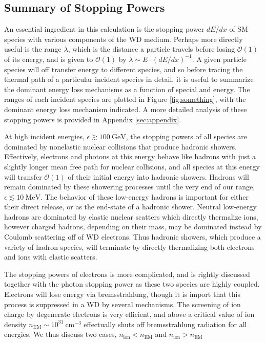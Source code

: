 \documentclass[twocolumn,showpacs,preprintnumbers,amsmath,amssymb,prd]{revtex4}
\newcommand{\OO}{\mathcal{O}}
\newcommand{\GeV}{\text{GeV}}
\newcommand{\MeV}{\text{MeV}}
\def\r{\right)}
\def\l{\left(}
\begin{document}
\subsection{Summary of Stopping Powers}

An essential ingredient in this calculation is the stopping power $dE/dx$ of SM species with various components of the WD medium. 
Perhaps more directly useful is the range $\lambda$, which is the distance a particle travels before losing $\OO(1)$ of its energy, and is given to $\OO(1)$ by $\lambda \sim E \cdot \l dE/dx \r^{-1}$.
A given particle species will off transfer energy to different species, and so before tracing the thermal path of a particular incident species in detail, it is useful to summarize the dominant energy loss mechanisms as a function of special and energy. 
The ranges of each incident species are plotted in Figure \ref{fig:something}, with the dominant energy loss mechanism indicated.
A more detailed analysis of these stopping powers is provided in Appendix \ref{sec:appendix}. 

At high incident energies, $\epsilon \gtrsim 100~\GeV$, the stopping powers of all species are dominated by nonelastic nuclear collisions that produce hadronic showers. 
Effectively, electrons and photons at this energy behave like hadrons with just a slightly longer mean free path for nuclear collisions, and all species at this energy will transfer $\OO(1)$ of their initial energy into hadronic showers.
Hadrons will remain dominated by these showering processes until the very end of our range, $\epsilon \lesssim 10~\MeV$. 
The behavior of these low-energy hadrons is important for either their direct release, or as the end-state of a hadronic shower. 
Neutral low-energy hadrons are dominated by elastic nuclear scatters which directly thermalize ions, however charged hadrons, depending on their mass, may be dominated instead by Coulomb scattering off of WD electrons.
Thus hadronic showers, which produce a variety of hadron species, will terminate by directly thermalizing both electrons and ions with elastic scatters. 

The stopping powers of electrons is more complicated, and is rightly discussed together with the photon stopping power as these two species are highly coupled. 
Electrons will lose energy via bremsstrahlung, though it is import that this process is suppressed in a WD by several mechanisms.
The screening of ion charge by degenerate electrons is very efficient, and above a critical value of ion density $n_\text{EM} \sim 10^{31} ~\text{cm}^{-3}$ effectually shuts off bremsstrahlung radiation for all energies.  
We thus discuss two cases, $n_\text{ion} < n_\text{EM}$ and $n_\text{ion} > n_\text{EM}$
\end{document}
